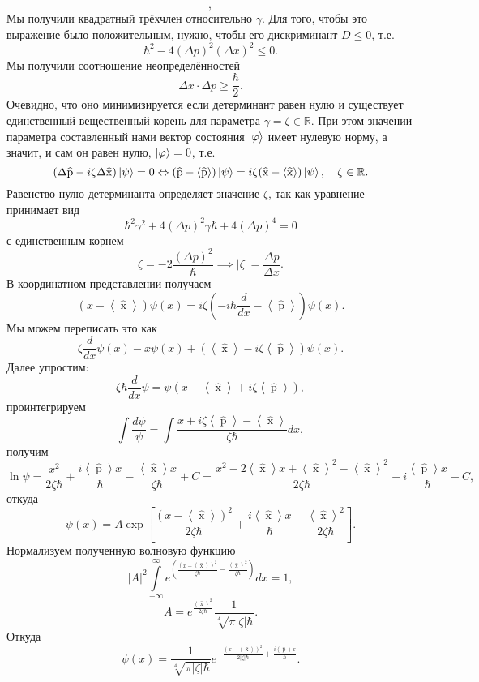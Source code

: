 \documentclass[a4paper]{article}
\begin{document}
\begin{sol}
\[,\]
Мы получили
квадратный трёхчлен относительно $\gamma$. Для того, чтобы это
выражение было положительным, нужно, чтобы его дискриминант
$D \le 0$, т.\:е.
\[
	\hbar^2 - 4 (\Delta p)^2
	(\Delta x)^2 \le 0
.\] 
Мы получили соотношение неопределённостей
\[
	\Delta x\cdot\Delta p \ge  \frac{\hbar}{2}
.\] 
Очевидно, что оно минимизируется если детерминант равен нулю
и существует единственный вещественный корень для параметра
$\gamma=\zeta \in \mathbb{R}$. При этом значении параметра
составленный нами вектор состояния $\ket{\varphi}$ имеет нулевую
норму, а значит, и сам  он равен нулю, $\ket{\varphi}=0$, т.\:е.
\[
	(\Delta \widehat{\operatorname{p}}-i \zeta 
	\Delta \widehat{\operatorname{x}})\ket{\psi}=0
	\Leftrightarrow 
	( \widehat{\operatorname{p}}- \left< \widehat{\operatorname{p}} \right>) \ket{\psi}= i \zeta
		(\widehat{\operatorname{x}}-\left<
		\widehat{\operatorname{x}}\right>)\ket{\psi},
		\quad \zeta \in \mathbb{R}
.\] 
Равенство нулю детерминанта определяет значение $\zeta$, так как
уравнение принимает вид
\[
	\hbar^2 \gamma^2 +4 (\Delta p)^2 \gamma \hbar+4 (\Delta p)^4=0
\] 
с единственным корнем
\[
	\zeta= - 2 \frac{(\Delta p)^2}{\hbar}\implies
	|\zeta|= \frac{\Delta p}{\Delta x}
.\] 
В координатном представлении получаем
\[
	\left(x- \left<\widehat{\operatorname{x}} \right>\right)
	\psi(x) = i \zeta \left( - i \hbar \frac{d}{dx}-
	\left<\widehat{\operatorname{p}} \right>\right) \psi(x)
.\] 
Мы можем переписать это как
\[
	\zeta \frac{d}{dx}\psi (x) - x \psi(x) +\left( 
	\left<\widehat{\operatorname{x}} \right>- i \zeta 
\left<\widehat{\operatorname{p}} \right>\right) \psi(x)
.\] 
Далее упростим:
\[
	\zeta \hbar \frac{d}{dx} \psi= \psi \left(x- \left<\widehat{\operatorname{x}} \right>+i \zeta \left<\widehat{\operatorname{p}} \right>\right)
,\]
проинтегрируем
\[
\int \frac{d\psi}{\psi}= \int \frac{x+ i \zeta \left< \widehat{\operatorname{p}} \right>- \left<\widehat{\operatorname{x}} \right>}{\zeta \hbar }dx
 ,\]
получим
\[
\ln \psi = \frac{x^2}{2 \zeta \hbar }+ \frac{i \left<\widehat{\operatorname{p}} \right>x}{\hbar } -\frac{\left<\widehat{\operatorname{x}} \right>x}{\zeta \hbar} +C=
\frac{x^{2}-2 \left<\widehat{\operatorname{x}} \right>x+
\left<\widehat{\operatorname{x}} \right>^2- \left<\widehat{\operatorname{x}} \right>^2}{2 \zeta \hbar }+ i \frac{\left<\widehat{\operatorname{p}} \right>x}{\hbar }+C
,\] 
откуда
\[
	\psi (x)= A \exp \left[ \frac{\left( x- \left<\widehat{\operatorname{x}} \right> \right) ^2}{2\zeta \hbar }+ \frac{i \left<\widehat{\operatorname{x}} \right>x}{\hbar }- \frac{\left<\widehat{\operatorname{x}} \right>^2}{2\zeta \hbar} \right] 
.\] 
Нормализуем полученную волновую функцию
\[
	|A|^2 \int\limits_{-\infty}^{\infty} e^{\left( 
	\frac{(x-\left<\widehat{\operatorname{x}} \right>)^2}{\zeta 
	\hbar}- \frac{\left<\widehat{\operatorname{x}} \right>^2}{\zeta \hbar }\right) }dx=1 
,\] 
\[
A= e^{\frac{\left<\widehat{\operatorname{x}} \right>^2}{2\zeta \hbar }}
\frac{1}{\sqrt[4]{\pi |\zeta| \hbar} }
.\] 
Откуда
\[
	\psi(x)= \frac{1}{\sqrt[4]{\pi |\zeta| \hbar } }e^{ -
	\frac{\left( x- \left<\widehat{\operatorname{x}} \right> \right) ^2}{2|\zeta|\hbar }+ \frac{i \left<\widehat{\operatorname{p}} \right> x}{\hbar}}
.\] 
\end{sol}
\end{document}
